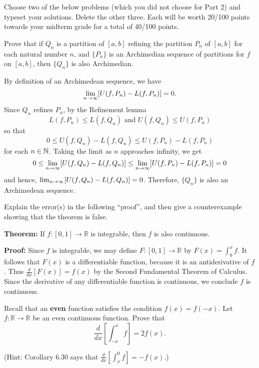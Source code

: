 \documentclass[letterpaper, twoside, 12pt]{book}
\begin{document}
Choose two of the below problems (which you did not choose for
Part 2) and typeset your solutions. Delete the other three.
Each will be worth 20/100 points towards your midterm grade
for a total of 40/100 points.


\begin{exercise}[1]
Prove that if \(Q_n\) is a partition of \([a,b]\) refining
the partition \(P_n\) of \([a,b]\) for each
natural number \(n\), and \(\{P_n\}\) is an Archimedian sequence of
partitions for \(f\) on \([a,b]\), then \(\{Q_n\}\) is also Archimedian.
\end{exercise}

\begin{solution}
    By definition of an Archimedean sequence, we have 
    \[\lim_{n \to \infty} [U(f, P_n) - L(f, P_n) ] = 0 . \]
    Since \(Q_n\) refines \(P_n\), by the Refinement lemma
    \[ L(f, P_n) \leq L(f, Q_n) \text{~and~} U(f, Q_n) \leq U(f, P_n) \]
    so that 
    \[ 0 \leq U(f, Q_n) - L(f, Q_n) \leq U(f, P_n) - L(f, P_n) \]
    for each \(n \in \mathbb N\). Taking the limit as \(n\) approaches
    infinity, we get
    \[ 0 \leq \lim_{n \to \infty} [U(f, Q_n) - L(f, Q_n)] \leq \lim_{n \to \infty} [U(f, P_n) - L(f, P_n)] = 0 \]
    and hence, \(\lim_{n \to \infty} [U(f, Q_n) - L(f, Q_n)] = 0\). Therefore,
    \(\{Q_n\}\) is also an Archimedean sequence.   
\end{solution}

\begin{exercise}[2]
Explain the error(s) in the following ``proof'',
and then give a counterexample showing that the theorem is false.

\textbf{Theorem:} If \(f:[0,1]\to\mathbb R\) is integrable, then
\(f\) is also continuous.

\textbf{Proof:}
Since \(f\) is integrable, we may define \(F:[0,1]\to\mathbb R\)
by \(F(x)=\int_0^x f\). It follows
that \(F(x)\) is a differentiable function, because it is an antiderivative
of \(f\). Thus \(\frac{d}{dx}[F(x)]=f(x)\) by the Second Fundamental
Theorem of Calculus. Since the derivative of any differentiable function
is continuous, we conclude \(f\) is continuous.
\end{exercise}
\begin{solution}

\end{solution}

\begin{exercise}[3]
Recall that an \textbf{even} function satisfies the condition \(f(x)=f(-x)\).
Let \(f:\mathbb R\to\mathbb R\) be an even continuous function.
Prove that
\[
  \frac{d}{dx}\left[\int_{-x}^x f\right]=2f(x)
.\]

(Hint: Corollary 6.30 says that \(\frac{d}{dx}[\int_{x}^0f]=-f(x)\).)
\end{exercise}
\end{document}
